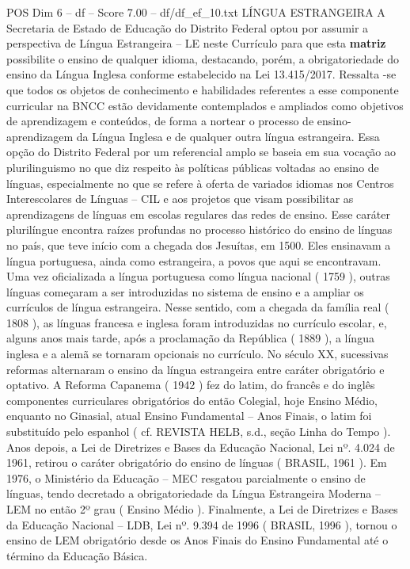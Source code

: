 \begin{textsample}{POS Dim 6 – df – Score 7.00 – df/df\_ef\_10.txt}  \label{ex:f6_pos_130}
LÍNGUA ESTRANGEIRA A Secretaria de Estado de Educação do Distrito Federal optou por assumir a perspectiva de Língua Estrangeira – LE neste Currículo para que esta \textbf{matriz} possibilite o ensino de qualquer idioma, destacando, porém, a obrigatoriedade do ensino da Língua Inglesa conforme estabelecido na Lei 13.415/2017.
Ressalta -se que todos os objetos de conhecimento e habilidades referentes a esse componente curricular na BNCC estão devidamente contemplados e ampliados como objetivos de aprendizagem e conteúdos, de forma a nortear o processo de ensino-aprendizagem da Língua Inglesa e de qualquer outra língua estrangeira.
Essa opção do Distrito Federal por um referencial amplo se baseia em sua vocação ao plurilinguismo no que diz respeito às políticas públicas voltadas ao ensino de línguas, especialmente no que se refere à oferta de variados idiomas nos Centros Interescolares de Línguas – CIL e aos projetos que visam possibilitar as aprendizagens de línguas em escolas regulares das redes de ensino.
Esse caráter plurilíngue encontra raízes profundas no processo histórico do ensino de línguas no país, que teve início com a chegada dos Jesuítas, em 1500.
Eles ensinavam a língua portuguesa, ainda como estrangeira, a povos que aqui se encontravam.
Uma vez oficializada a língua portuguesa como língua nacional ( 1759 ), outras línguas começaram a ser introduzidas no sistema de ensino e a ampliar os currículos de língua estrangeira.
Nesse sentido, com a chegada da família real ( 1808 ), as línguas francesa e inglesa foram introduzidas no currículo escolar, e, alguns anos mais tarde, após a proclamação da República ( 1889 ), a língua inglesa e a alemã se tornaram opcionais no currículo.
No século XX, sucessivas reformas alternaram o ensino da língua estrangeira entre caráter obrigatório e optativo.
A Reforma Capanema ( 1942 ) fez do latim, do francês e do inglês componentes curriculares obrigatórios do então Colegial, hoje Ensino Médio, enquanto no Ginasial, atual Ensino Fundamental – Anos Finais, o latim foi substituído pelo espanhol ( cf.
REVISTA HELB, s.d., seção Linha do Tempo ).
Anos depois, a Lei de Diretrizes e Bases da Educação Nacional, Lei nº. 4.024 de 1961, retirou o caráter obrigatório do ensino de línguas ( BRASIL, 1961 ).
Em 1976, o Ministério da Educação – MEC resgatou parcialmente o ensino de línguas, tendo decretado a obrigatoriedade da Língua Estrangeira Moderna – LEM no então 2º grau ( Ensino Médio ).
Finalmente, a Lei de Diretrizes e Bases da Educação Nacional – LDB, Lei nº. 9.394 de 1996 ( BRASIL, 1996 ), tornou o ensino de LEM obrigatório desde os Anos Finais do Ensino Fundamental até o término da Educação Básica.

\end{textsample}
